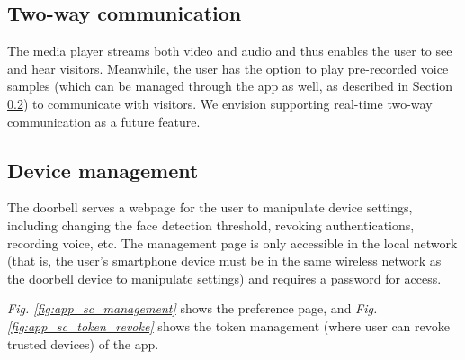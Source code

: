 \subsection{Two-way communication}
The media player streams both video and audio and thus enables the user to see and hear visitors. Meanwhile, the user has the option to play pre-recorded voice samples (which can be managed through the app as well, as described in Section \ref{sec:management}) to communicate with visitors. We envision supporting real-time two-way communication as a future feature.

\subsection{Device management}
\label{sec:management}
The doorbell serves a webpage for the user to manipulate device settings, including changing the face detection threshold, revoking authentications, recording voice, etc. The management page is only accessible in the local network (that is, the user's smartphone device must be in the same wireless network as the doorbell device to manipulate settings) and requires a password for access.

\textit{Fig. \ref{fig:app_sc_management}} shows the preference page, and \textit{Fig. \ref{fig:app_sc_token_revoke}} shows the token management (where user can revoke trusted devices) of the app.

